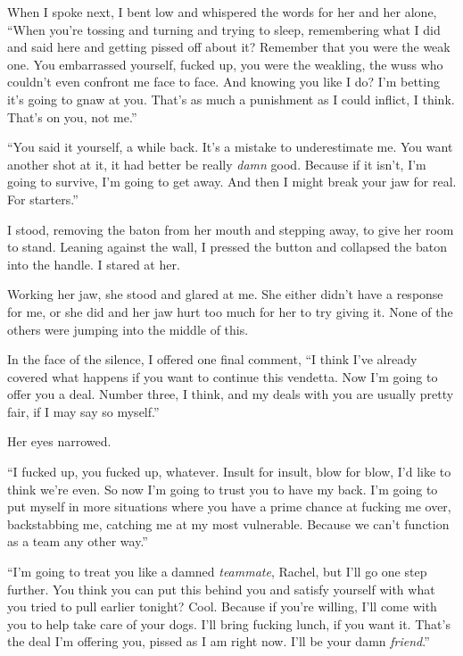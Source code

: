 When I spoke next, I bent low and whispered the words for her and her alone, ``When you're tossing and turning and trying to sleep, remembering what I did and said here and getting pissed off about it?  Remember that you were the weak one.  You embarrassed yourself, fucked up, you were the weakling, the wuss who couldn't even confront me face to face.  And knowing you like I do?  I'm betting it's going to gnaw at you.  That's as much a punishment as I could inflict, I think.  That's on you, not me.''



``You said it yourself, a while back.  It's a mistake to underestimate me.  You want another shot at it, it had better be really \emph{damn} good.  Because if it isn't, I'm going to survive, I'm going to get away.  And then I might break your jaw for real.  For starters.''



I stood, removing the baton from her mouth and stepping away, to give her room to stand.  Leaning against the wall, I pressed the button and collapsed the baton into the handle.  I stared at her.



Working her jaw, she stood and glared at me.  She either didn't have a response for me, or she did and her jaw hurt too much for her to try giving it.  None of the others were jumping into the middle of this.



In the face of the silence, I offered one final comment, ``I think I've already covered what happens if you want to continue this vendetta.  Now I'm going to offer you a deal.  Number three, I think, and my deals with you are usually pretty fair, if I may say so myself.''



Her eyes narrowed.



``I fucked up, you fucked up, whatever.  Insult for insult, blow for blow, I'd like to think we're even.  So now I'm going to trust you to have my back.  I'm going to put myself in more situations where you have a prime chance at fucking me over, backstabbing me, catching me at my most vulnerable.  Because we can't function as a team any other way.''



``I'm going to treat you like a damned \emph{teammate}, Rachel, but I'll go one step further.  You think you can put this behind you and satisfy yourself with what you tried to pull earlier tonight?  Cool.  Because if you're willing, I'll come with you to help take care of your dogs.  I'll bring fucking lunch, if you want it.  That's the deal I'm offering you, pissed as I am right now.  I'll be your damn \emph{friend}.''



